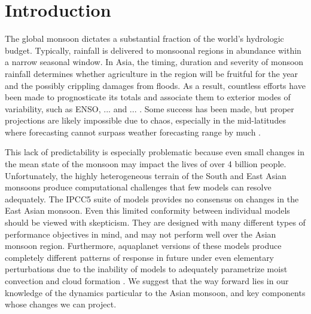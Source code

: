 \section{Introduction}


	The global monsoon dictates a substantial fraction of the world's hydrologic budget. Typically, rainfall is delivered to monsoonal regions in abundance within a narrow seasonal window. In Asia, the timing, duration and severity of monsoon rainfall determines whether agriculture in the region will be fruitful for the year and the possibly crippling damages from floods. As a result, countless efforts have been made to prognosticate its totals and associate them to exterior modes of variability, such as ENSO, ... and ... . Some success has been made, but proper projections are likely impossible due to chaos, especially in the mid-latitudes where forecasting cannot surpass weather forecasting range by much \citep{Teng2013}.
	
	This lack of predictability is especially problematic because even small changes in the mean state of the monsoon may impact the lives of over 4 billion people. Unfortunately, the highly heterogeneous terrain of the South and East Asian monsoons produce computational challenges that few models can resolve adequately. The IPCC5 suite of models provides no consensus on changes in the East Asian monsoon. Even this limited conformity between individual models should be viewed with skepticism. They are designed with many different types of performance objectives in mind, and may not perform well over the Asian monsoon region. Furthermore, aquaplanet versions of these models produce completely different patterns of response in future under even elementary perturbations due to the inability of models to adequately parametrize moist convection and cloud formation \citep{Stevens2013}. We suggest that the way forward lies in our knowledge of the dynamics particular to the Asian monsoon, and key components whose changes we can project.

